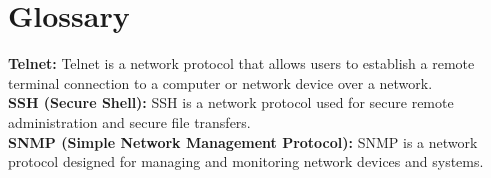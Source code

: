 \chapter{Glossary}
\label{chap:Glossary} 


\textbf{Telnet:} Telnet is a network protocol that allows users to establish a remote terminal connection to a computer or network device over a network.\\


\textbf{SSH (Secure Shell):} SSH is a network protocol used for secure remote administration and secure file transfers.\\


\textbf{SNMP (Simple Network Management Protocol):} SNMP is a network protocol designed for managing and monitoring network devices and systems.\\


\pagebreak